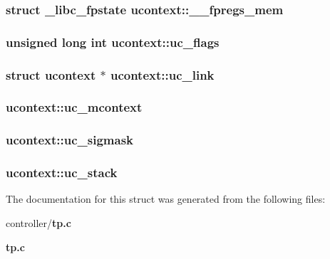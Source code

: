 \subsubsection[{\_\-\_\-fpregs\_\-mem}]{\setlength{\rightskip}{0pt plus 5cm}struct {\bf \_\-libc\_\-fpstate} {\bf ucontext::\_\-\_\-fpregs\_\-mem}}\label{structucontext_a1479d0a3b358f3eb4e5db0597c989811}
\subsubsection[{uc\_\-flags}]{\setlength{\rightskip}{0pt plus 5cm}unsigned long int {\bf ucontext::uc\_\-flags}}\label{structucontext_a04f4b489f191e6063f521f7517eeb2d2}
\subsubsection[{uc\_\-link}]{\setlength{\rightskip}{0pt plus 5cm}struct {\bf ucontext} $\ast$ {\bf ucontext::uc\_\-link}}\label{structucontext_a17cc5b1fb12c721625899e5014220445}
\subsubsection[{uc\_\-mcontext}]{ {\bf ucontext::uc\_\-mcontext}}\label{structucontext_a2f11c88226a10ce97471da1a23701a7f}
\subsubsection[{uc\_\-sigmask}]{ {\bf ucontext::uc\_\-sigmask}}\label{structucontext_a8789077ba91fb325228d05394de6c745}
\subsubsection[{uc\_\-stack}]{ {\bf ucontext::uc\_\-stack}}\label{structucontext_a8081adf8cabac97c6faec20544a1b28e}


The documentation for this struct was generated from the following files:\begin{DoxyCompactItemize}
\item 
controller/{\bf tp.c}\item 
{\bf tp.c}\end{DoxyCompactItemize}
